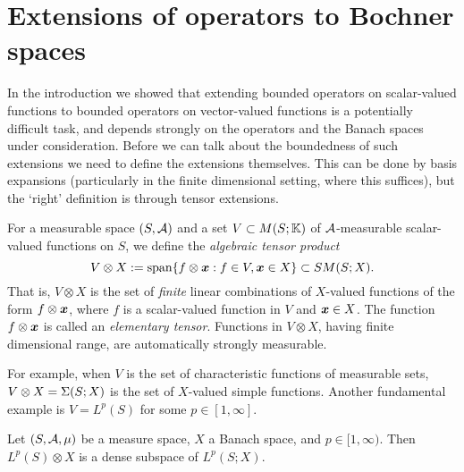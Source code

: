 \section{Extensions of operators to Bochner spaces}

In the introduction we showed that extending bounded operators on scalar-valued functions to bounded operators on vector-valued functions is a potentially difficult task, and depends strongly on the operators and the Banach spaces under consideration.
Before we can talk about the boundedness of such extensions we need to define the extensions themselves.
This can be done by basis expansions (particularly in the finite dimensional setting, where this suffices), but the `right' definition is through tensor extensions.

\begin{defn}
  For a measurable space $(S,\mathcal{A})$ and a set $V \subset M(S;\mathbb{K})$ of $\mathcal{A}$-measurable scalar-valued functions on $S$, we define the \emph{algebraic tensor product}
  \begin{equation*}
    V \otimes X := \mathrm{span}\{f \otimes \bm{x} : f \in V, \bm{x} \in X\} \subset SM(S;X).
  \end{equation*}
  That is, $V \otimes X$ is the set of \emph{finite} linear combinations of $X$-valued functions of the form $f \otimes \bm{x}$, where $f$ is a scalar-valued function in $V$ and $\bm{x} \in X$.
  The function $f \otimes \bm{x}$ is called an \emph{elementary tensor}.
  Functions in $V \otimes X$, having finite dimensional range, are automatically strongly measurable.
\end{defn}

For example, when $V$ is the set of characteristic functions of measurable sets, $V \otimes X = \Sigma(S;X)$ is the set of $X$-valued simple functions.
Another fundamental example is $V = L^p(S)$ for some $p \in [1,\infty]$.

\begin{prop}\label{prop:ATP-density}
  Let $(S,\mathcal{A},\mu)$ be a measure space, $X$ a Banach space, and $p \in [1,\infty)$.
  Then $L^p(S) \otimes X$ is a dense subspace of $L^p(S;X)$.
\end{prop}

